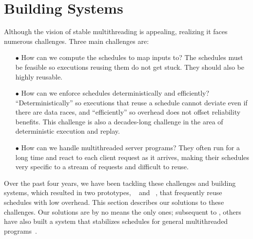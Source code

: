 \section{Building \smt Systems} \label{sec:done}

Although the vision of stable multithreading is appealing, realizing it
faces numerous challenges.  Three main challenges are:

\begin{enumerate}

\item[$\bullet$] How can we compute the schedules to map inputs to?  The 
schedules
  must be feasible so executions reusing them do not get stuck.
  They should also be highly reusable.

\item[$\bullet$] How can we enforce schedules deterministically and
  efficiently?  ``Deterministically'' so executions that reuse a schedule
  cannot deviate even if there are data races, and ``efficiently'' so
  overhead does not offset reliability benefits.
  This challenge is also a decades-long challenge in the area of
  deterministic execution and replay.

\item[$\bullet$] How can we handle multithreaded server programs?  They often 
run for a
  long time and react to each client request as it arrives, making their
  schedules very specific to a stream of requests and difficult to reuse.

\end{enumerate}

Over the past four years, we have been tackling these challenges and
building \smt systems, which resulted in two \smt prototypes,
\tern~\cite{cui:tern:osdi10} and \peregrine~\cite{peregrine:sosp11}, that
frequently reuse schedules with low overhead.  This section describes our
solutions to these challenges.  Our solutions are by no means the only
ones; subsequent to \tern, others have also built a system that
stabilizes schedules for general multithreaded programs~\cite{dthreads:sosp11}.









